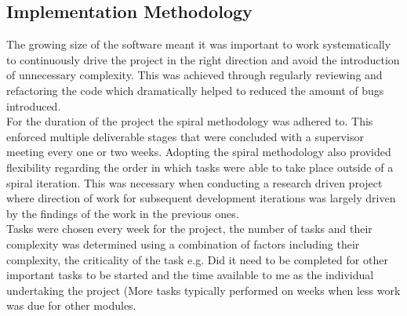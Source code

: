 \subsection{Implementation Methodology}
The growing size of the software meant it was important to work systematically to continuously drive the project in the right direction and avoid the introduction of unnecessary complexity. This was achieved through regularly reviewing and refactoring the code which dramatically helped to reduced the amount of bugs introduced. \\

\noindent
For the duration of the project the spiral methodology was adhered to. This enforced multiple deliverable stages that were concluded with a supervisor meeting every one or two weeks. Adopting the spiral methodology also provided flexibility regarding the order in which tasks were able to take place outside of a spiral iteration. This was necessary when conducting a research driven project where direction of work for subsequent development iterations was largely driven by the  findings of the work in the previous ones. \\

\noindent
Tasks were chosen every week for the project, the number of tasks and their complexity was determined using a combination of factors including their complexity, the criticality of the task e.g. Did it need to be completed for other important tasks to be started and the time available to me as the individual undertaking the project (More tasks typically performed on weeks when less work was due for other modules. \\ 


